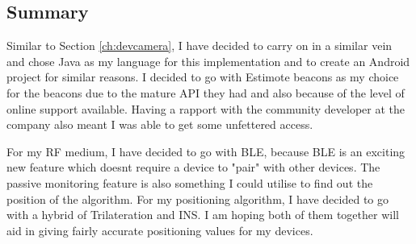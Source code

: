\subsection{Summary}
Similar to Section \ref{ch:devcamera}, I have decided to carry on in a similar vein and chose Java as my language for this implementation and to create an Android project for similar reasons. I decided to go with Estimote beacons as my choice for the beacons due to the mature API they had and also because of the level of online support available. Having a rapport with the community developer at the company also meant I was able to get some unfettered access. 

For my RF medium, I have decided to go with BLE, because BLE is an exciting new feature which doesnt require a device to "pair" with other devices. The passive monitoring feature is also something I could utilise to find out the position of the algorithm. For my positioning algorithm, I have decided to go with a hybrid of Trilateration and INS. I am hoping both of them together will aid in giving fairly accurate positioning values for my devices.
